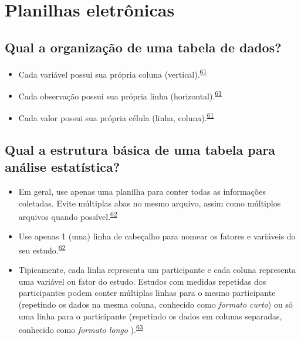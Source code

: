 \documentclass[
]{book}
\begin{document}
\hypertarget{planilhas}{%
\section{Planilhas eletrônicas}\label{planilhas}}

\hypertarget{qual-a-organizauxe7uxe3o-de-uma-tabela-de-dados}{%
\subsection{Qual a organização de uma tabela de dados?}\label{qual-a-organizauxe7uxe3o-de-uma-tabela-de-dados}}

\begin{itemize}
\item
  Cada variável possui sua própria coluna (vertical).\textsuperscript{\protect\hyperlink{ref-tierney2023}{61}}
\item
  Cada observação possui sua própria linha (horizontal).\textsuperscript{\protect\hyperlink{ref-tierney2023}{61}}
\item
  Cada valor possui sua própria célula (linha, coluna).\textsuperscript{\protect\hyperlink{ref-tierney2023}{61}}
\end{itemize}

\hypertarget{qual-a-estrutura-buxe1sica-de-uma-tabela-para-anuxe1lise-estatuxedstica}{%
\subsection{Qual a estrutura básica de uma tabela para análise estatística?}\label{qual-a-estrutura-buxe1sica-de-uma-tabela-para-anuxe1lise-estatuxedstica}}

\begin{itemize}
\item
  Em geral, use apenas uma planilha para conter todas as informações coletadas. Evite múltiplas abas no mesmo arquivo, assim como múltiplos arquivos quando possível.\textsuperscript{\protect\hyperlink{ref-broman2018}{62}}
\item
  Use apenas 1 (uma) linha de cabeçalho para nomear os fatores e variáveis do seu estudo.\textsuperscript{\protect\hyperlink{ref-broman2018}{62}}
\item
  Tipicamente, cada linha representa um participante e cada coluna representa uma variável ou fator do estudo. Estudos com medidas repetidas dos participantes podem conter múltiplas linhas para o mesmo participante (repetindo os dados na mesma coluna, conhecido como \emph{formato curto}) ou só uma linha para o participante (repetindo os dados em colunas separadas, conhecido como \emph{formato longo} ).\textsuperscript{\protect\hyperlink{ref-Juluru2015}{63}}
\end{itemize}
\end{document}
